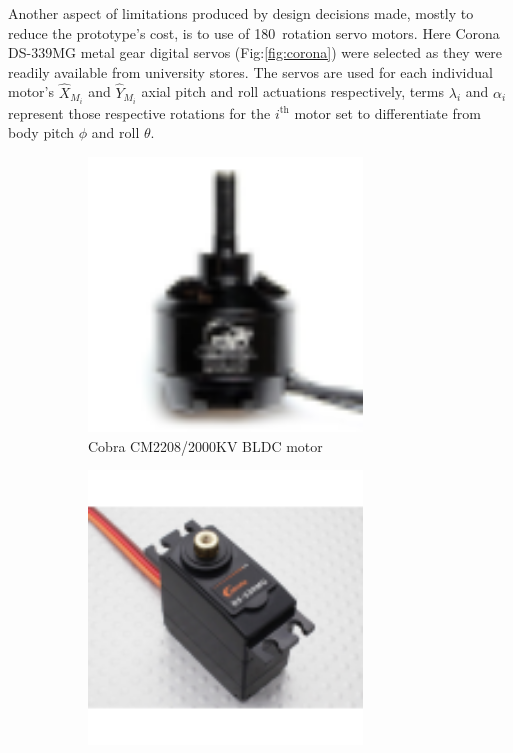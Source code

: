 \par
Another aspect of limitations produced by design decisions made, mostly to reduce the prototype's cost, is to use of 180\textdegree ~rotation servo motors. Here Corona DS-339MG metal gear digital servos (Fig:\ref{fig:corona}) were selected as they were readily available from university stores. The servos are used for each individual motor's $\hat{X}_{M_i}$ and $\hat{Y}_{M_i}$ axial pitch and roll actuations respectively, terms $\lambda_i$ and $\alpha_i$ represent those respective rotations for the $i^{\text{th}}$ motor set to differentiate from body pitch $\phi$ and roll $\theta$.
\par
\begin{figure}[hbtp]
\vspace{-4pt}
\begin{subfigure}{0.5\textwidth}
\centering
\includegraphics[width=0.8\textwidth]{figs/cobra-motor}
\vspace{-6pt}
\caption{Cobra CM2208/2000KV BLDC motor~\cite{cobraimage}}
\label{fig:cobra}
\end{subfigure}
\begin{subfigure}{0.5\textwidth}
\centering
\includegraphics[width=0.8\textwidth]{figs/corona-servo}

\end{subfigure}
\end{figure}
